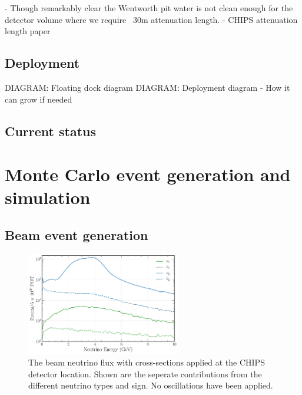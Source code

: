 - Though remarkably clear the Wentworth pit water is not clean enough for the detector volume
where we require ~30m attenuation length.
- CHIPS attenuation length paper~\cite{amat2017}

\subsection{Deployment} %
\label{sec:chips_detector_deployment} %

DIAGRAM: Floating dock diagram
DIAGRAM: Deployment diagram
- How it can grow if needed

\subsection{Current status} %
\label{sec:chips_detector_status} %

\section{Monte Carlo event generation and simulation} %
\label{sec:chips_monte_carlo} %

\subsection{Beam event generation} %
\label{sec:chips_monte_carlo_beam} %

\begin{figure} %
    \includegraphics[width=0.6\textwidth]{diagrams/4-chips/flux.pdf}
    \caption[\numi neutrino flux at CHIPS.]
    {The \numi beam neutrino flux with cross-sections applied at the CHIPS detector location. Shown
        are the seperate contributions from the different neutrino types and sign. No oscillations
        have been applied.}
    \label{fig:flux}
\end{figure}

